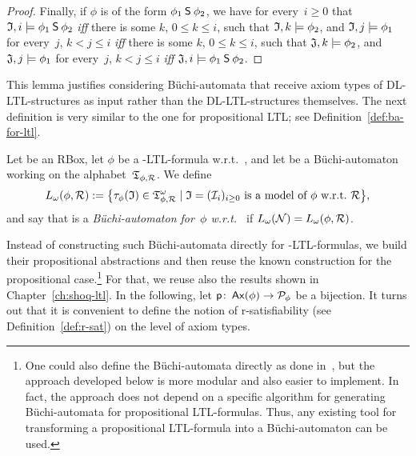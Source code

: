 \begin{proof}
    Finally, if $\phi$ is of the form $\phi_1\mathbin{\mathsf{S}}\phi_2$, we have for
    every~$i\ge 0$ that $\mathfrak{I},i\models\phi_1\mathbin{\mathsf{S}}\phi_2$ \emph{iff} there is
    some $k$, $0\le k\le i$, such that $\mathfrak{I},k\models\phi_2$, and
    $\mathfrak{I},j\models\phi_1$ for every~$j$, $k<j\le i$ \emph{iff} there is some
    $k$, $0\le k\le i$, such that $\mathfrak{J},k\models\phi_2$, and
    $\mathfrak{J},j\models\phi_1$ for every~$j$, $k<j\le i$ \emph{iff}
    $\mathfrak{J},i\models\phi_1\mathbin{\mathsf{S}}\phi_2$.
\end{proof}

\noindent
This lemma justifies considering Büchi-automata that receive axiom types of
DL-LTL-structures as input rather than the DL-LTL-structures themselves.  The
next definition is very similar to the one for propositional LTL\@; see
Definition~\ref{def:ba-for-ltl}.

\begin{definition}
    Let \Rmc be an RBox, let $\phi$ be a \SHOQ-LTL-formula w.r.t.~\Rmc, and let
    \Nmc be a Büchi-automaton working on the alphabet~$\mathfrak{T}_{\phi,\mathcal{R}}$.  We
    define
    \[L_\omega(\phi,\Rmc):=\bigl\{\tau_\phi(\Imf)\in\Tmf_{\phi,\Rmc}^\omega\mid%
        \Imf=(\Imc_i)_{i\ge 0}\ \text{is a model of~$\phi$ w.r.t.~\Rmc}\bigr\},\]
    and say that \Nmc is a \emph{Büchi-automaton for~$\phi$ w.r.t.~\Rmc} if
    $L_\omega(\mathcal{N})=L_\omega(\phi,\mathcal{R})$.
\end{definition}

\noindent
Instead of constructing such Büchi-automata directly for \SHOQ-LTL-formulas, we
build their propositional abstractions and then reuse the known construction for
the propositional case.\footnote{%
    One could also define the Büchi-automata directly as done
    in~\cite{BaBL-FroCoS09,Lip-Dipl09}, but the approach developed below is more
    modular and also easier to implement.  In fact, the approach does not depend
    on a specific algorithm for generating Büchi-automata for propositional
    LTL-formulas.  Thus, any existing tool for transforming a propositional
LTL-formula into a Büchi-automaton can be used.}
%
For that, we reuse also the results shown in Chapter~\ref{ch:shoq-ltl}.  In the
following, let $\mathsf{p}\colon\operatorname{\mathsf{Ax}}(\phi)\to\mathcal{P}_\phi$ be a bijection.
%
It turns out that it is convenient to define the notion of r-satisfiability (see
Definition~\ref{def:r-sat}) on the level of axiom types.

